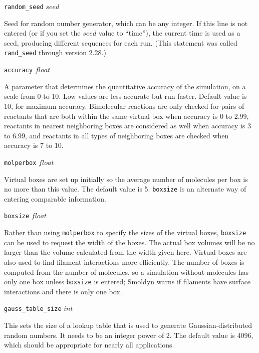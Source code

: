 \documentclass {scrbook}
\newcommand {\ttt} {\texttt}
\begin{document}
\begin{description}

\item{\ttt{random\_seed} $seed$}

Seed for random number generator, which can be any integer. If this line is not entered (or if you set the $seed$ value to ``time''), the current time is used as a seed, producing different sequences for each run. (This statement was called \ttt{rand\_seed} through version 2.28.)

\item{\ttt{accuracy} $float$}

A parameter that determines the quantitative accuracy of the simulation, on a scale from 0 to 10. Low values are less accurate but run faster. Default value is 10, for maximum accuracy. Bimolecular reactions are only checked for pairs of reactants that are both within the same virtual box when accuracy is 0 to 2.99, reactants in nearest neighboring boxes are considered as well when accuracy is 3 to 6.99, and reactants in all types of neighboring boxes are checked when accuracy is 7 to 10.

\item{\ttt{molperbox} $float$}

Virtual boxes are set up initially so the average number of molecules per box is no more than this value. The default value is 5. \ttt{boxsize} is an alternate way of entering comparable information.

\item{\ttt{boxsize} $float$}

Rather than using \ttt{molperbox} to specify the sizes of the virtual boxes, \ttt{boxsize} can be used to request the width of the boxes. The actual box volumes will be no larger than the volume calculated from the width given here. Virtual boxes are also used to find filament interactions more efficiently. The number of boxes is computed from the number of molecules, so a simulation without molecules has only one box unless \ttt{boxsize} is entered; Smoldyn warns if filaments have surface interactions and there is only one box.

\item{\ttt{gauss\_table\_size} $int$}

This sets the size of a lookup table that is used to generate Gaussian-distributed random numbers. It needs to be an integer power of 2. The default value is 4096, which should be appropriate for nearly all applications.


\end{description}
\end{document}
